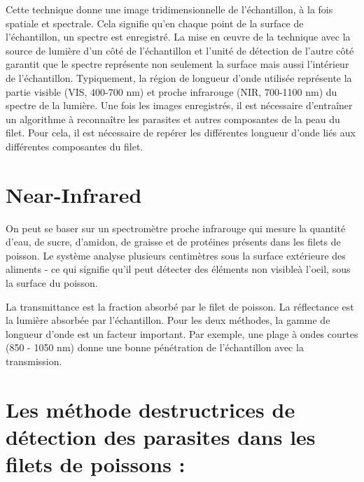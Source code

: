 \documentclass[12pt,a4paper]{article}
\begin{document}
Cette technique donne une image tridimensionnelle de l'échantillon, à la fois spatiale et spectrale. Cela signifie qu'en chaque point de la surface de l'échantillon, un spectre est enregistré. La mise en œuvre de la technique avec la source de lumière d'un côté de l'échantillon et l'unité de détection de l'autre côté garantit que le spectre représente non seulement la surface mais aussi l'intérieur de l'échantillon.
Typiquement, la région de longueur d'onde utilisée représente la partie visible (VIS, 400-700 nm) et proche infrarouge (NIR, 700-1100 nm) du spectre de la lumière.
Une fois les images enregistrés, il est nécessaire d'entraîner un algorithme à reconnaître les parasites et autres composantes de la peau du filet.
Pour cela, il est nécessaire de repérer les différentes longueur d'onde liés aux différentes composantes du filet.


\section{Near-Infrared}

On peut se baser sur un spectromètre proche infrarouge qui mesure la quantité d'eau, de sucre, d'amidon, de graisse et de protéines présents dans les filets de poisson. Le système analyse plusieurs centimètres sous la surface extérieure des aliments - ce qui signifie qu'il peut détecter des éléments non visibleà l'oeil, sous la surface du poisson.


La transmittance est la fraction absorbé par le filet de poisson. La réflectance est la lumière absorbée par l'échantillon.
Pour les deux méthodes, la gamme de longueur d'onde est un facteur important. Par exemple, une plage à ondes courtes (850 - 1050 nm) donne une bonne pénétration de l'échantillon avec la transmission.


\newpage
\section {Les  méthode destructrices de détection des parasites dans les filets de poissons :}
\end{document}
